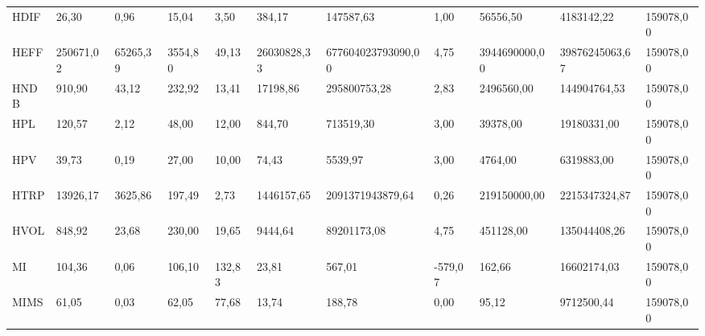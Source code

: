 \begin{table}[H]
{\begin{tabular}{@{}lp{10mm}p{10mm}p{10mm}p{10mm}llllll@{}}
HDIF                                & 26,30          & 0,96                    & 15,04            & 3,50          & 384,17                         & 147587,63                         & 1,00            & 56556,50        & 4183142,22     & 159078,00       \\
HEFF                                & 250671,02      & 65265,39                & 3554,80          & 49,13         & 26030828,33                    & 677604023793090,00                & 4,75            & 3944690000,00   & 39876245063,67 & 159078,00       \\
HNDB                                & 910,90         & 43,12                   & 232,92           & 13,41         & 17198,86                       & 295800753,28                      & 2,83            & 2496560,00      & 144904764,53   & 159078,00       \\
HPL                                 & 120,57         & 2,12                    & 48,00            & 12,00         & 844,70                         & 713519,30                         & 3,00            & 39378,00        & 19180331,00    & 159078,00       \\
HPV                                 & 39,73          & 0,19                    & 27,00            & 10,00         & 74,43                          & 5539,97                           & 3,00            & 4764,00         & 6319883,00     & 159078,00       \\
HTRP                                & 13926,17       & 3625,86                 & 197,49           & 2,73          & 1446157,65                     & 2091371943879,64                  & 0,26            & 219150000,00    & 2215347324,87  & 159078,00       \\
HVOL                                & 848,92         & 23,68                   & 230,00           & 19,65         & 9444,64                        & 89201173,08                       & 4,75            & 451128,00       & 135044408,26   & 159078,00       \\
MI                                  & 104,36         & 0,06                    & 106,10           & 132,83        & 23,81                          & 567,01                            & -579,07         & 162,66          & 16602174,03    & 159078,00       \\
MIMS                                & 61,05          & 0,03                    & 62,05            & 77,68         & 13,74                          & 188,78                            & 0,00            & 95,12           & 9712500,44     & 159078,00       \\

\end{tabular}}
\end{table}
